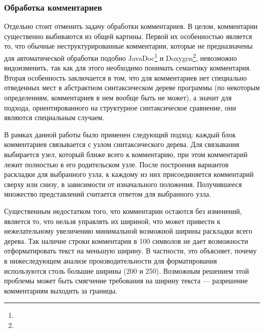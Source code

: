 


\newpage
\subsubsection{Обработка комментариев}

Отдельно стоит отменить задачу обработки комментариев. В целом, комментарии
существенно выбиваются из общей картины. Первой их особенностью является то,
что обычные неструктурированные комментарии, которые не
предназначены для автоматической обработки подобно
JavaDoc\footnote{}
и Doxygen\footnote{},
невозможно видоизменить, так как для этого необходимо понимать семантику
комментария. Вторая особенность заключается в том, что для комментариев нет
специально отведенных мест в абстрактном синтаксическом дереве программы
(по некоторым определениям, комментариев в нем вообще быть не может), а значит
для подхода, ориентированного на структурное синтаксическое сравнение, они
являются специальным случаем.

В рамках данной работы было применен следующий подход: каждый блок комментариев
связывается с узлом синтаксического дерева. Для связывания выбирается узел, который
ближе всего к комментарию, при этом комментарий лежит полностью в его родительском узле.
После построения вариантов раскладки для выбранного узла, к каждому из них
присоединяется комментарий сверху или снизу, в зависимости от изначального положения.
Получившееся множество представлений считается ответом для выбранного узла.

Существенным недостатком того, что комментарии остаются без изменений,
является то, что нельзя управлять их шириной, что может привести к нежелательному
увеличению минимальной возможной ширины раскладки всего дерева.
Так наличие строки комментария в
100 символов не дает возможности отформатировать текст на меньшую ширину.
В частности, это объясняет, почему в нижеследующем анализе производительности для
форматирования используются столь большие ширины (200 и 250). Возможным решением
этой проблемы может быть смягчение требования на ширину текста --- разрешение
комментариям выходить за границы.

